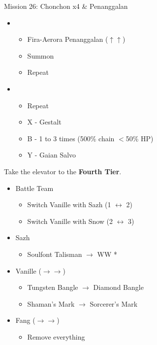 	\begin{battle}[0:26]{Mission 26: Chonchon x4 \& Penanggalan}
		\begin{itemize}
			\item \second
			      \begin{itemize}
				      \item Fira-Aerora Penanggalan ($\uparrow\uparrow$)
				      \item Summon
				      \item Repeat
			      \end{itemize}
			      \columnbreak
			\item \third
			      \begin{itemize}
				      \item Repeat
				      \item X - Gestalt
				      \item B - 1 to 3 times (500\% chain $<$50\% HP)
				      \item Y - Gaian Salvo
			      \end{itemize}
		\end{itemize}
	\end{battle}
	Take the elevator to the \textbf{Fourth Tier}.

	\begin{menu}
		\begin{itemize}
			\paradigm
			\begin{itemize}
				\item Battle Team
				      \begin{itemize}
					      \item Switch Vanille with Sazh (1 $\leftrightarrow$ 2)
					      \item Switch Vanille with Snow (2 $\leftrightarrow$ 3)
				      \end{itemize}
			\end{itemize}
			\equip
			\begin{itemize}
				\item Sazh
				      \begin{itemize}
					      \item Soulfont Talisman $\rightarrow$ WW *
				      \end{itemize}
				\item Vanille ($\rightarrow\rightarrow$)
				      \begin{itemize}
					      \item Tungsten Bangle $\rightarrow$ Diamond Bangle
					      \item Shaman's Mark $\rightarrow$ Sorcerer's Mark
				      \end{itemize}
				\item Fang ($\rightarrow\rightarrow$)
				      \begin{itemize}
					      \item Remove everything
				      \end{itemize}
			\end{itemize}
		\end{itemize}
	\end{menu}

